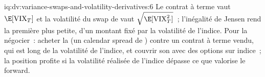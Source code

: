 \begin{solution}{iq:dv:variance-swaps-and-volatility-derivatives:6}
Le contrat à terme vaut $\E[\mathrm{VIX}_T]$ et la volatilité du swap de  vaut $\sqrt{\E[\mathrm{VIX}_T^2]}$~; l'inégalité de Jensen
rend la première plus petite, d'un montant fixé par la volatilité de l'indice. Pour la négocier~: acheter la 
(un calendar spread de ) contre un contrat à terme vendu, qui est long de la volatilité de l'indice,
et couvrir son  avec des options sur indice~; la position profite si la volatilité réalisée de l'indice dépasse ce que
valorise le forward.
\end{solution}
